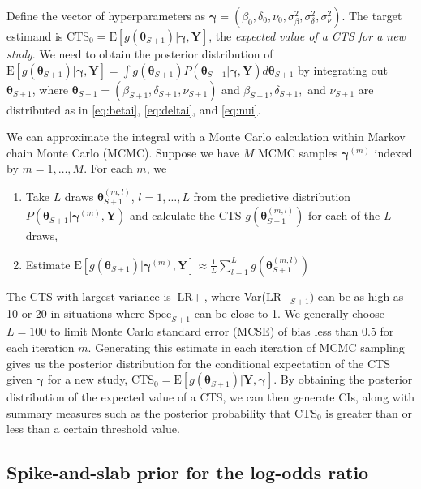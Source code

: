 \documentclass[AMA,STIX1COL]{WileyNJD-v2}
\newcommand{\E}{\mbox{E}}
\newcommand{\boldtheta}{\boldsymbol{\theta}}
\newcommand{\boldgamma}{\boldsymbol{\gamma}}
\begin{document}
Define the vector of hyperparameters as $\boldgamma = (\beta_0, \delta_0, \nu_0, \sigma^2_{\beta}, \sigma^2_{\delta}, \sigma^2_{\nu})$. The target estimand is $\mbox{CTS}_0 = \E[g(\boldtheta_{S+ 1})\vert \boldgamma, \boldsymbol{Y}]$, the \textit{expected value of a CTS for a new study}. We need to obtain the posterior distribution of $\E[g(\boldtheta_{S + 1})\vert \boldgamma, \boldsymbol{Y}] = \boldsymbol{\int}g(\boldtheta_{S + 1})  P(\boldtheta_{S + 1} \vert \boldgamma, \boldsymbol{Y}) d\boldtheta_{S + 1}$ by integrating out $\boldtheta_{S + 1}$, where $\boldtheta_{S + 1} = (\beta_{S + 1}, \delta_{S + 1}, \nu_{S + 1})$ and $\beta_{S + 1}, \delta_{S + 1},$ and $\nu_{S + 1}$ are distributed as in \eqref{eq:betai}, \eqref{eq:deltai}, and \eqref{eq:nui}.

We can approximate the integral with a Monte Carlo calculation within Markov chain Monte Carlo (MCMC). Suppose we have $M$ MCMC samples $\boldgamma^{(m)}$ indexed by $m = 1, \dots, M$. For each $m$, we
\begin{enumerate}
\item Take $L$ draws $\boldtheta_{S + 1}^{(m, l)}$, $l = 1, \dots, L$ from the predictive distribution $P(\boldtheta_{S + 1}\vert \boldgamma^{(m)}, \boldsymbol{Y})$ and calculate the CTS $g(\boldtheta_{S + 1}^{(m, l)})$ for each of the $L$ draws, 
\item Estimate $\E[g(\boldtheta_{S + 1})\vert \boldgamma^{(m)}, \boldsymbol{Y}] \approx \frac{1}{L} \sum_{l=1}^L g(\boldtheta_{S + 1}^{(m, l)})$
\end{enumerate}
The CTS with largest variance is $\mbox{LR}+$, where Var($\mbox{LR}+_{S+1}$) can be as high as 10 or 20 in situations where $\mbox{Spec}_{S+1}$ can be close to 1. We generally choose $L = 100$ to limit Monte Carlo standard error (MCSE) of bias less than 0.5 for each iteration $m$. Generating this estimate in each iteration of MCMC sampling gives us the posterior distribution for the conditional expectation of the CTS given $\boldgamma$ for a new study, $\mbox{CTS}_0 = \E[g(\boldtheta_{S + 1}) \vert \boldsymbol{Y}, \boldgamma]$. By obtaining the posterior distribution of the expected value of a CTS, we can then generate CIs, along with summary measures such as the posterior probability that $\mbox{CTS}_0$ is greater than or less than a certain threshold value. 

\subsection{Spike-and-slab prior for the log-odds ratio} \label{sec:spike}
\end{document}
